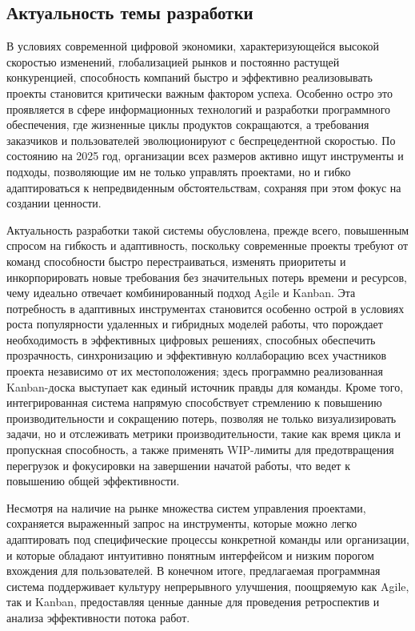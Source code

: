 \subsection{Актуальность темы разработки}
В условиях современной цифровой экономики, характеризующейся высокой скоростью изменений, глобализацией рынков и постоянно растущей конкуренцией, способность компаний быстро и эффективно реализовывать проекты становится критически важным фактором успеха. Особенно остро это проявляется в сфере информационных технологий и разработки программного обеспечения, где жизненные циклы продуктов сокращаются, а требования заказчиков и пользователей эволюционируют с беспрецедентной скоростью. По состоянию на 2025 год, организации всех размеров активно ищут инструменты и подходы, позволяющие им не только управлять проектами, но и гибко адаптироваться к непредвиденным обстоятельствам, сохраняя при этом фокус на создании ценности.

Актуальность разработки такой системы обусловлена, прежде всего, повышенным спросом на гибкость и адаптивность, поскольку современные проекты требуют от команд способности быстро перестраиваться, изменять приоритеты и инкорпорировать новые требования без значительных потерь времени и ресурсов, чему идеально отвечает комбинированный подход Agile и Kanban. Эта потребность в адаптивных инструментах становится особенно острой в условиях роста популярности удаленных и гибридных моделей работы, что порождает необходимость в эффективных цифровых решениях, способных обеспечить прозрачность, синхронизацию и эффективную коллаборацию всех участников проекта независимо от их местоположения; здесь программно реализованная Kanban-доска выступает как единый источник правды для команды. Кроме того, интегрированная система напрямую способствует стремлению к повышению производительности и сокращению потерь, позволяя не только визуализировать задачи, но и отслеживать метрики производительности, такие как время цикла и пропускная способность, а также применять WIP-лимиты для предотвращения перегрузок и фокусировки на завершении начатой работы, что ведет к повышению общей эффективности. 

Несмотря на наличие на рынке множества систем управления проектами, сохраняется выраженный запрос на инструменты, которые можно легко адаптировать под специфические процессы конкретной команды или организации, и которые обладают интуитивно понятным интерфейсом и низким порогом вхождения для пользователей. В конечном итоге, предлагаемая программная система поддерживает культуру непрерывного улучшения, поощряемую как Agile, так и Kanban, предоставляя ценные данные для проведения ретроспектив и анализа эффективности потока работ.
